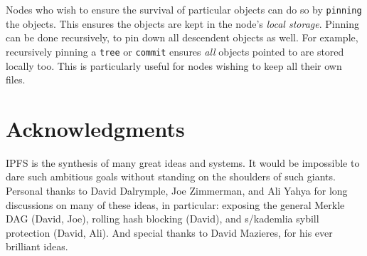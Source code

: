 \documentclass{sig-alternate}
\begin{document}
Nodes who wish to ensure the survival of particular objects can do so by
\texttt{pinning} the objects. This ensures the objects are kept in the node's
\textit{local storage}. Pinning can be done recursively, to pin down all
descendent objects as well. For example, recursively pinning a \texttt{tree}
or \texttt{commit} ensures \textit{all} objects pointed to are stored locally
too. This is particularly useful for nodes wishing to keep all their own files.


\section{Acknowledgments}

IPFS is the synthesis of many great ideas and systems. It would be impossible to dare such ambitious goals without standing on the shoulders of such giants. Personal thanks to David Dalrymple, Joe Zimmerman, and Ali Yahya for long discussions on many of these ideas, in particular: exposing the general Merkle DAG (David, Joe), rolling hash blocking (David), and s/kademlia sybill protection (David, Ali). And special thanks to David Mazieres, for his ever brilliant ideas.

%
%
\end{document}

